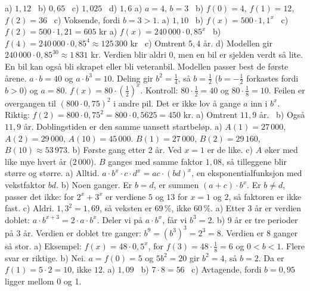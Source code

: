 
 a) $1{,}12$ \ b) $0{,}65$ \ c) $1{,}025$ \ d) $1{,}6$
 a) $a = 4$, $b = 3$ \ b) $f(0) = 4$, $f(1) = 12$, $f(2) = 36$ \ c) Voksende, fordi $b = 3 > 1$.
 a) $1{,}10$ \ b) $f(x) = 500 \cdot 1{,}1^x$ \ c) $f(2) = 500 \cdot 1{,}21 = 605$ kr
 a) $f(x) = 240\,000 \cdot 0{,}85^x$ \ b) $f(4) = 240\,000 \cdot 0{,}85^4 \approx 125\,300$ kr \ c) Omtrent $5{,}4$ år. d) Modellen gir $240\,000 \cdot 0{,}85^{30} \approx 1\,831$ kr. Verdien blir aldri 0, men en bil er sjelden verdt så lite. En bil kan også bli skrapet eller bli veteranbil. Modellen passer best de første årene.
 $a \cdot b = 40$ og $a \cdot b^3 = 10$. Deling gir $b^2 = \frac14$, så $b = \frac12$ ($b = -\frac12$ forkastes fordi $b > 0$) og $a = 80$. $f(x) = 80 \cdot \left(\frac12\right)^x$.
Kontroll: $80 \cdot \frac12 = 40$ og $80 \cdot \frac18 = 10$.
 Feilen er overgangen til $(800 \cdot 0{,}75)^2$ i andre pil. Det er ikke lov å gange $a$ inn i $b^x$. Riktig: $f(2) = 800 \cdot 0{,}75^2 = 800 \cdot 0{,}5625 = 450$ kr.
 a) Omtrent $11{,}9$ år. \ b) Også $11{,}9$ år. Doblingstiden er den samme uansett startbeløp.
 a) $A(1) = 27\,000$, $A(2) = 29\,000$, $A(10) = 45\,000$. $B(1) = 27\,000$, $B(2) = 29\,160$, $B(10) \approx 53\,973$.
b) Første gang etter 2 år. Ved $x = 1$ er de like. c) $A$ øker med like mye hvert år ($2\,000$). $B$ ganges med samme faktor $1{,}08$, så tilleggene blir større og større.
 a) Alltid. $a \cdot b^x \cdot c \cdot d^x = ac \cdot (bd)^x$, en eksponentialfunksjon med vekstfaktor $bd$.
b) Noen ganger. Er $b = d$, er summen $(a + c) \cdot b^x$. Er $b \ne d$, passer det ikke: for $2^x + 3^x$ er verdiene $5$ og $13$ for $x = 1$ og $2$, så faktoren er ikke fast.
c) Aldri. $1{,}3^2 = 1{,}69$, så veksten er $69\,\%$, ikke $60\,\%$.
 a) Etter 3 år er verdien doblet: $a \cdot b^{x+3} = 2 \cdot a \cdot b^x$. Deler vi på $a \cdot b^x$, får vi $b^3 = 2$.
b) 9 år er tre perioder på 3 år. Verdien er doblet tre ganger: $b^9 = (b^3)^3 = 2^3 = 8$. Verdien er 8 ganger så stor.
 a) Eksempel: $f(x) = 48 \cdot 0{,}5^x$, for $f(3) = 48 \cdot \frac18 = 6$ og $0 < b < 1$. Flere svar er riktige.
b) Nei. $a = f(0) = 5$ og $5b^2 = 20$ gir $b^2 = 4$, så $b = 2$. Da er $f(1) = 5 \cdot 2 = 10$, ikke $12$.
 a) $1{,}09$ \ b) $7 \cdot 8 = 56$ \ c) Avtagende, fordi $b = 0{,}95$ ligger mellom 0 og 1.

